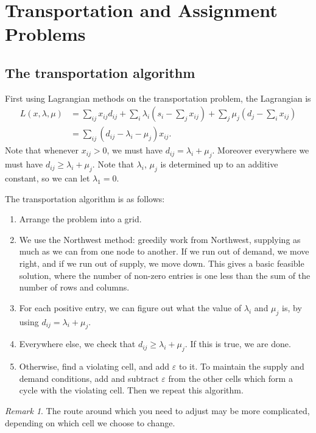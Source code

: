 \documentclass[12pt]{article}
\theoremstyle{definition}
\theoremstyle{remark}
\newtheorem*{remark}{Remark}
\begin{document}
\newpage

\section{Transportation and Assignment Problems}%
\label{sec:transportation_and_assignment_problems}

\subsection{The transportation algorithm}%
\label{sub:the_transportation_algorithm}

First using Lagrangian methods on the transportation problem, the Lagrangian is
\begin{align*}
	L(x, \lambda, \mu) &= \sum_{ij}x_{ij}d_{ij} + \sum_{i} \lambda_i \left(s_i - \sum_{j}x_{ij}\right) + \sum_{j}\mu_j \left(d_j - \sum_{i}x_{ij}\right) \\
			   &= \sum_{ij}(d_{ij} - \lambda_i - \mu_j) x_{ij}.
\end{align*}
Note that whenever $x_{ij} > 0$, we must have $d_{ij} = \lambda_i + \mu_j$. Moreover everywhere we must have $d_{ij} \geq \lambda_i + \mu_j$. Note that $\lambda_i$, $\mu_j$ is determined up to an additive constant, so we can let $\lambda_1 = 0$.

The transportation algorithm is as follows:

\begin{enumerate}[1)]
	\item Arrange the problem into a grid.
	\item We use the Northwest method: greedily work from Northwest, supplying as much as we can from one node to another. If we run out of demand, we move right, and if we run out of supply, we move down. This gives a basic feasible solution, where the number of non-zero entries is one less than the sum of the number of rows and columns.
	\item For each positive entry, we can figure out what the value of $\lambda_i$ and $\mu_j$ is, by using $d_{ij} = \lambda_i + \mu_j$.
	\item Everywhere else, we check that $d_{ij} \geq \lambda_i + \mu_j$. If this is true, we are done.
	\item Otherwise, find a violating cell, and add $\varepsilon$ to it. To maintain the supply and demand conditions, add and subtract $\varepsilon$ from the other cells which form a cycle with the violating cell. Then we repeat this algorithm.
\end{enumerate}

\begin{remark}
	The route around which you need to adjust may be more complicated, depending on which cell we choose to change.
\end{remark}



\newpage

\printindex
\end{document}
